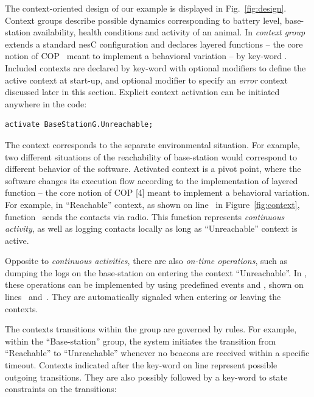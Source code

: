 The context-oriented design of our example is displayed in
Fig.~\ref{fig:design}. Context groups describe possible dynamics
corresponding to battery level, base-station availability, health conditions and
activity of an animal. In \conesc \emph{context group} extends a standard nesC
configuration and declares layered functions -- the core notion of
COP~\cite{Hirschfeld08} meant to implement a behavioral variation -- by key-word
. Included contexts are declared by key-word  with
optional modifiers  to define the active context at start-up,
and optional modifier  to specify an \emph{error} context
discussed later in this section. Explicit context activation can be initiated
anywhere in the code:

\vspace{-1mm}
\begin{lstlisting}[language=conesc]
activate BaseStationG.Unreachable;
\end{lstlisting}
\vspace{-1.5mm}

The context corresponds to the separate environmental situation. For example,
two different situations of the reachability of base-station would correspond to
different behavior of the software. Activated context is a pivot point, where
the software changes its execution flow according to the implementation of
layered function -- the core notion of COP [4] meant to implement a behavioral
variation. For example, in ``Reachable'' context, as shown on
line~ in Figure~\ref{fig:context}, function~
sends the contacts via radio. This function represents \emph{continuous
activity}, as well as logging contacts locally as long as ``Unreachable'' context
is active.

Opposite to \emph{continuous activities}, there are also \emph{on-time
operations}, such as dumping the logs on the base-station on entering the
context ``Unreachable''. In \conesc, these operations can be implemented by using
predefined events  and , shown on
lines~ and~. They are automatically
signaled when entering or leaving the contexts.

The contexts transitions within the group are governed by rules. For example,
within the ``Base-station'' group, the system initiates the transition from
``Reachable'' to ``Unreachable'' whenever no beacons are received within a
specific timeout. Contexts indicated after the key-word  on
line  represent possible outgoing transitions. They are also
possibly followed by a key-word  to state constraints on the
transitions:


